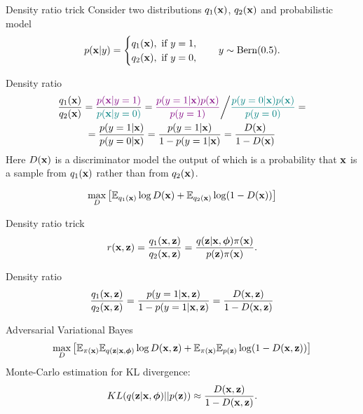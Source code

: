 \documentclass{beamer}
\begin{document}
\begin{frame}{Density ratio trick}
	Consider two distributions $q_1(\mathbf{x})$, $q_2(\mathbf{x})$ and probabilistic model
	\[
		p(\mathbf{x} | y) = \begin{cases}
			q_1(\mathbf{x}), \text{ if } y = 1, \\
			q_2(\mathbf{x}), \text{ if } y = 0,
		\end{cases}
		\quad 
		y \sim \text{Bern}(0.5).
	\]
	\vspace{-0.3cm}
	\begin{block}{Density ratio}
		\vspace{-0.7cm}
		{\small
		\begin{multline*}
			\frac{q_1(\mathbf{x})}{q_2(\mathbf{x})} = \frac{{\color{violet}p(\mathbf{x} | y = 1)}}{{\color{teal}p(\mathbf{x} | y = 0)}} = {\color{violet}\frac{p(y = 1 | \mathbf{x}) p(\mathbf{x})}{p(y=1)}} \bigg/ {\color{teal}\frac{p(y = 0 | \mathbf{x}) p(\mathbf{x})}{p(y=0)}} = \\
			= \frac{p(y = 1 | \mathbf{x})}{p(y = 0 | \mathbf{x})} = \frac{p(y = 1 | \mathbf{x})}{1 - p(y = 1 | \mathbf{x})} = \frac{D(\mathbf{x})}{1 - D(\mathbf{x})}
		\end{multline*}
		}
	Here $D(\mathbf{x})$ is a discriminator model the output of which is a probability that $\mathbf{x}$ is a sample from $q_1(\mathbf{x})$ rather than from $q_2(\mathbf{x})$.
	\end{block}
		\vspace{-0.3cm}
		\[
			\max_D \left[ \mathbb{E}_{q_1(\mathbf{x})} \log D(\mathbf{x}) + \mathbb{E}_{q_2(\mathbf{x})} \log (1 - D(\mathbf{x})) \right]
		\]
\end{frame}
\begin{frame}{Density ratio trick}
	\[
		r(\mathbf{x}, \mathbf{z}) = \frac{q_1(\mathbf{x}, \mathbf{z})}{q_2(\mathbf{x}, \mathbf{z})} = \frac{q(\mathbf{z}| \mathbf{x}, \boldsymbol{\phi}) \pi (\mathbf{x})}{p(\mathbf{z}) \pi(\mathbf{x})}.
	\] 
	\begin{block}{Density ratio}
		\vspace{-0.2cm}
		\[
			\frac{q_1(\mathbf{x}, \mathbf{z})}{q_2(\mathbf{x}, \mathbf{z})} = \frac{p(y = 1 | \mathbf{x}, \mathbf{z})}{1 - p(y = 1 | \mathbf{x}, \mathbf{z})} = \frac{D(\mathbf{x}, \mathbf{z})}{1 - D(\mathbf{x}, \mathbf{z})}
		\]
	\end{block}
	\begin{block}{Adversarial Variational Bayes}
		\vspace{-0.6cm}
		\[
		\max_D \left[ \mathbb{E}_{\pi(\mathbf{x})} \mathbb{E}_{q(\mathbf{z} | \mathbf{x}, \boldsymbol{\phi})} \log D(\mathbf{x}, \mathbf{z}) + \mathbb{E}_{\pi(\mathbf{x})} \mathbb{E}_{p(\mathbf{z})} \log (1 - D(\mathbf{x}, \mathbf{z})) \right]
		\]
		Monte-Carlo estimation for KL divergence:
		\vspace{-0.2cm}
		\[
			KL(q(\mathbf{z}| \mathbf{x}, \boldsymbol{\phi}) || p(\mathbf{z})) \approx \frac{D(\mathbf{x}, \mathbf{z})}{1 - D(\mathbf{x}, \mathbf{z})}.
		\]
	\end{block}
\end{frame}
\end{document}
